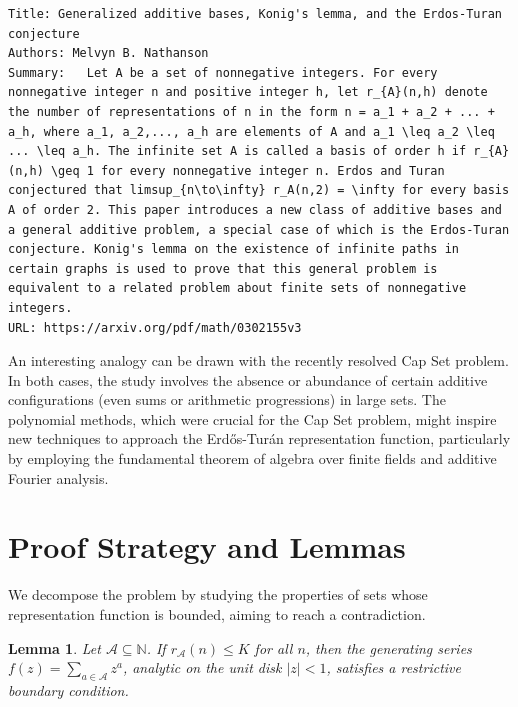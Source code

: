 \documentclass[11pt,a4paper]{article}
\newtheorem{lemma}{Lemma}
\begin{document}
\begin{verbatim}
Title: Generalized additive bases, Konig's lemma, and the Erdos-Turan conjecture
Authors: Melvyn B. Nathanson
Summary:   Let A be a set of nonnegative integers. For every nonnegative integer n and positive integer h, let r_{A}(n,h) denote the number of representations of n in the form n = a_1 + a_2 + ... + a_h, where a_1, a_2,..., a_h are elements of A and a_1 \leq a_2 \leq ... \leq a_h. The infinite set A is called a basis of order h if r_{A}(n,h) \geq 1 for every nonnegative integer n. Erdos and Turan conjectured that limsup_{n\to\infty} r_A(n,2) = \infty for every basis A of order 2. This paper introduces a new class of additive bases and a general additive problem, a special case of which is the Erdos-Turan conjecture. Konig's lemma on the existence of infinite paths in certain graphs is used to prove that this general problem is equivalent to a related problem about finite sets of nonnegative integers.
URL: https://arxiv.org/pdf/math/0302155v3
\end{verbatim}

An interesting analogy can be drawn with the recently resolved Cap Set problem. In both cases, the study involves the absence or abundance of certain additive configurations (even sums or arithmetic progressions) in large sets. The polynomial methods, which were crucial for the Cap Set problem, might inspire new techniques to approach the Erd\H{o}s-Tur\'an representation function, particularly by employing the fundamental theorem of algebra over finite fields and additive Fourier analysis.

\section{Proof Strategy and Lemmas}

We decompose the problem by studying the properties of sets whose representation function is bounded, aiming to reach a contradiction.

\begin{lemma}
Let $\mathcal{A} \subseteq \mathbb{N}$. If $r_{\mathcal{A}}(n) \le K$ for all $n$, then the generating series $f(z) = \sum_{a \in \mathcal{A}} z^a$, analytic on the unit disk $|z| < 1$, satisfies a restrictive boundary condition.
\end{lemma}
\end{document}
